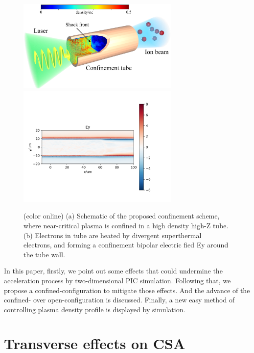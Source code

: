 \documentclass[12pt]{iopart}
\begin{document}
\begin{figure}
    \includegraphics[width=8cm]{sketch.eps}\label{fig:sketch}
    \includegraphics[width=8cm]{confine_ey.png} \label{fig:confine_ey}
    \caption{(color online) (a) Schematic of the proposed confinement scheme, where near-critical plasma is confined in a high density high-Z tube. (b) Electrons in tube are heated by divergent superthermal electrons, and forming a confinement bipolar electric fied Ey around the tube wall.}
\end{figure}

In this paper, firstly, we point out some effects that could undermine the acceleration process by two-dimensional PIC simulation. Following that, we propose a confined-configuration to mitigate those effects. And the advance of the confined- over open-configuration is discussed. Finally, a new easy method of controlling plasma density profile is displayed by simulation. 
 
\section{Transverse effects on CSA}
\label{theory}
 
\end{document}
